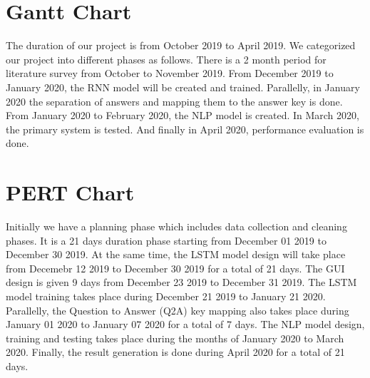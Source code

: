 \section{Gantt Chart}

\noindent The duration of our project is from October 2019 to April 2019.
We categorized our project into different phases as follows. There
is a 2 month period for literature survey from October to November 2019.
From December 2019 to January 2020, the RNN model will be created and trained.
Parallelly, in January 2020 the separation of answers and mapping them
to the answer key is done. From January 2020 to February 2020,
the NLP model is created. In March 2020, the primary system is tested.
And finally in April 2020, performance evaluation is done. 
\newpage
\section{PERT Chart}

\noindent Initially we have a planning phase which includes data collection and
cleaning phases. It is a 21 days duration phase starting from December 01 2019 to
December 30 2019. At the same time, the LSTM model design will take place from
Decemebr 12 2019 to December 30 2019 for a total of 21 days. The GUI design
is given 9 days from December 23 2019 to December 31 2019. The LSTM model training
takes place during December 21 2019 to January 21 2020. Parallelly, the
Question to Answer (Q2A) key mapping also takes place during January 01 2020
to January 07 2020 for a total of 7 days. The NLP model design, training and testing
takes place during the months of January 2020 to March 2020. Finally, the result generation
is done during April 2020 for a total of 21 days. 
